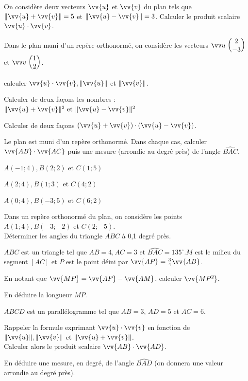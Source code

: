 \documentclass[11pt,a4paper]{article}  %
\begin{document}
\exerciceDS{}
On considère deux vecteurs $\vv{u}$ et $\vv{v}$ du plan tels que $\|\vv{u}+\vv{v}\|=5$ et $\|\vv{u}-\vv{v}\|=3$. Calculer le produit scalaire $\vv{u} \cdot \vv{v}$.

\exerciceDS{}
Dans le plan muni d'un repère orthonormé, on considère les vecteurs
$\Coord{u}{2}{-3}$ et $\Coord{v}{1}{2}$.
\begin{enumMet}
	\item calculer $\vv{u} \cdot \vv{v},\|\vv{u}\|$ et $\|\vv{v}\|$.
	\item Calculer de deux façons les nombres : $\|\vv{u}+\vv{v}\|^{2} \text { et }\|\vv{u}-\vv{v}\|^{2}$
	\item Calculer de deux façons $(\vv{u}+\vv{v}) \cdot(\vv{u}-\vv{v})$.
\end{enumMet}

\exerciceDS{}
Le plan est muni d'un repère orthonormé. Dans chaque cas, calculer $\vv{A B} \cdot \vv{A C}$ puis une mesure (arrondie au degré près) de l'angle $\widehat{B A C}$.
\begin{enumMet}
	\item $A(-1 ; 4), B(2 ; 2)$ et $C(1 ; 5)$
	\item $A(2 ; 4), B(1 ; 3)$ et $C(4 ; 2)$
	\item $A(0 ; 4), B(-3 ; 5)$ et $C(6 ; 2)$
\end{enumMet}


\exerciceDS{}
Dans un repère orthonormé du plan, on considère les points $A(1 ; 4), B(-3 ;-2)$ et $C(2 ;-5)$.\\
Déterminer les angles du triangle $A B C$ à 0,1 degré près.

\exerciceDS{}
$A B C$ est un triangle tel que $A B=4, A C=3$ et $\widehat{B A C}=135^{\circ} . M$ est le milieu du segment $[A C]$ et $P$ est le point déini par $\vv{A P}=\frac{3}{4} \vv{A B}$.
\begin{enumMet}
	\item En notant que $\vv{M P}=\vv{A P}-\vv{A M}$, calculer $\vv{M P^{2}}$.
	\item En déduire la longueur $M P$.
\end{enumMet}

\exerciceDS{}
$A B C D$ est un parallélogramme tel que $A B=3$, $A D=5$ et $A C=6$.
\begin{enumMet}
	\item Rappeler la formule exprimant $\vv{u} \cdot \vv{v}$ en fonction de $\|\vv{u}\|,\|\vv{v}\|$ et $\|\vv{u}+\vv{v}\|$.\\
	Calculer alors le produit scalaire $\vv{A B} \cdot \vv{A D}$.
	\item En déduire une mesure, en degré, de l'angle $\widehat{B A D}$ (on donnera une valeur arrondie au degré près).
\end{enumMet}
\end{document}
